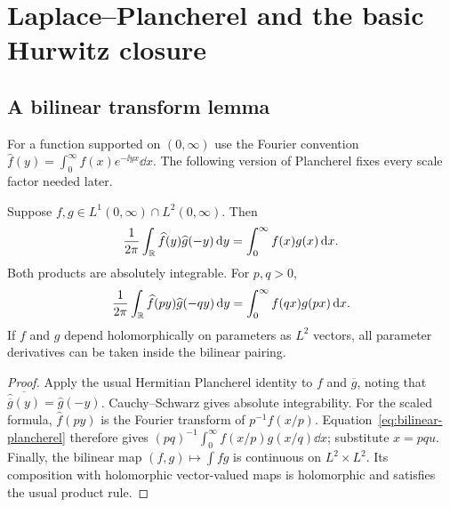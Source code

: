 \section{Laplace--Plancherel and the basic Hurwitz closure}
\label{sec:laplace}

\subsection{A bilinear transform lemma}
For a function supported on $(0,\infty)$ use the Fourier convention
$\widehat f(y)=\int_0^\infty f(x)e^{-\ii yx}\dd x$.
The following version of Plancherel fixes every scale factor needed later.

\begin{lemma}\label{thm:plancherel}
Suppose $f,g\in L^1(0,\infty)\cap L^2(0,\infty)$. Then
\begin{equation}\label{eq:bilinear-plancherel}
 \frac1{2\pi}\int_{\mathbb R}\widehat f(y)\widehat g(-y)\,\mathrm d y
     =\int_0^\infty f(x)g(x)\,\mathrm d x.
\end{equation}
Both products are absolutely integrable. For $p,q>0$,
\begin{equation}\label{eq:scaled-plancherel}
 \frac1{2\pi}\int_{\mathbb R}\widehat f(py)\widehat g(-qy)\,\mathrm d y
     =\int_0^\infty f(qx)g(px)\,\mathrm d x.
\end{equation}
If $f$ and $g$ depend holomorphically on parameters as $L^2$ vectors, all
parameter derivatives can be taken inside the bilinear pairing.
\end{lemma}
\begin{proof}
Apply the usual Hermitian Plancherel identity to $f$ and $\overline g$,
noting that $\overline{\widehat{\overline g}(y)}=\widehat g(-y)$.
Cauchy--Schwarz gives absolute integrability. For the scaled formula,
$\widehat f(py)$ is the Fourier transform of $p^{-1}f(x/p)$.
Equation~\eqref{eq:bilinear-plancherel} therefore gives
$(pq)^{-1}\int_0^\infty f(x/p)g(x/q)\dd x$; substitute $x=pqu$.
Finally, the bilinear map $(f,g)\mapsto\int fg$ is continuous on
$L^2\times L^2$. Its composition with holomorphic vector-valued maps is
holomorphic and satisfies the usual product rule.
\end{proof}

